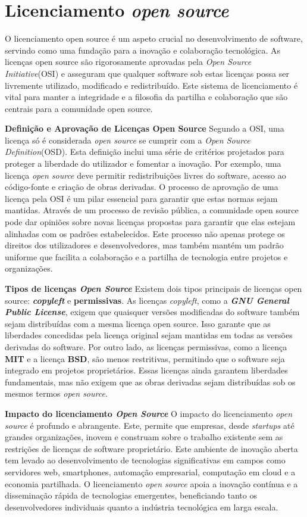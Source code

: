 \section{Licenciamento \textit{open source}} \label{section: licenciamento}
O licenciamento open source é um aspeto crucial no desenvolvimento de software, servindo como uma fundação para a inovação e colaboração tecnológica.
As licenças open source são rigorosamente aprovadas pela \textit{Open Source Initiative}(OSI) e asseguram que qualquer software sob estas licenças possa ser livremente utilizado, modificado e redistribuído.
Este sistema de licenciamento é vital para manter a integridade e a filosofia da partilha e colaboração que são centrais para a comunidade open source.


\textbf{Definição e Aprovação de Licenças Open Source}
Segundo a OSI, uma licença só é considerada \textit{open source} se cumprir com a \textit{Open Source Definition}(OSD). Esta definição inclui uma série de critérios projetados para proteger a liberdade do
utilizador e fomentar a inovação. Por exemplo, uma licença \textit{open source} deve permitir redistribuições livres do software, acesso ao código-fonte e criação de obras derivadas.
O processo de aprovação de uma licença pela OSI é um pilar essencial para garantir que estas normas sejam mantidas. Através de um processo de revisão pública, a comunidade open source pode dar opiniões 
sobre novas licenças propostas para garantir que elas estejam alinhadas com os padrões estabelecidos. Este processo não apenas protege os direitos dos utilizadores e desenvolvedores, mas também mantém um 
padrão uniforme que facilita a colaboração e a partilha de tecnologia entre projetos e organizações.


\textbf{Tipos de licenças \textit{Open Source}}
Existem dois tipos principais de licenças open source: \textbf{\textit{copyleft}} e \textbf{permissivas}. As licenças \textit{copyleft}, como a \textbf{\textit{GNU General Public License}}, exigem que quaisquer versões
modificadas do software também sejam distribuídas com a mesma licença open source. Isso garante que as liberdades concedidas pela licença original sejam mantidas em todas as versões derivadas do software. 
Por outro lado, as licenças permissivas, como a licença \textbf{MIT} e a licença \textbf{BSD}, são menos restritivas, permitindo que o software seja integrado em projetos proprietários. 
Essas licenças ainda garantem liberdades fundamentais, mas não exigem que as obras derivadas sejam distribuídas sob os mesmos termos \textit{open source}.


\textbf{Impacto do licenciamento \textit{Open Source}}
O impacto do licenciamento \textit{open source} é profundo e abrangente. Este, permite que empresas, desde \textit{startups} até grandes organizações, inovem e construam sobre o trabalho existente sem as 
restrições de licenças de software proprietário.
Este ambiente de inovação aberta tem levado ao desenvolvimento de tecnologias significativas em campos como servidores web, smartphones, automação empresarial, computação em cloud e a economia partilhada. 
O licenciamento \textit{open source} apoia a inovação contínua e a disseminação rápida de tecnologias emergentes, beneficiando tanto os desenvolvedores individuais quanto a indústria tecnológica em larga escala.
